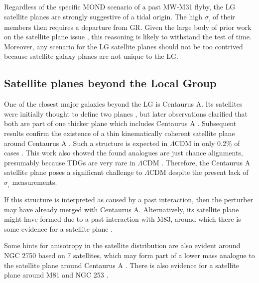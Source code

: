 \documentclass[fleqn,usenatbib,useAMS,onecolumn]{mnras} %
\begin{document}
Regardless of the specific MOND scenario of a past MW-M31 flyby, the LG satellite planes are strongly suggestive of a tidal origin. The high $\sigma_{_i}$ of their members then requires a departure from GR. Given the large body of prior work on the satellite plane issue \citep[reviewed in][]{Pawlowski_2018, Pawlowski_2021}, this reasoning is likely to withstand the test of time. Moreover, any scenario for the LG satellite planes should not be too contrived because satellite galaxy planes are not unique to the LG.



\subsection{Satellite planes beyond the Local Group}
\label{Satellite_planes_beyond_Local_Group}

One of the closest major galaxies beyond the LG is Centaurus A. Its satellites were initially thought to define two planes \citep{Tully_2015_Cen_A}, but later observations clarified that both are part of one thicker plane which includes Centaurus A \citep{Muller_2016}. Subsequent results confirm the existence of a thin kinematically coherent satellite plane around Centaurus A \citep{Muller_2018}. Such a structure is expected in $\Lambda$CDM in only 0.2\% of cases \citep{Muller_2021}. This work also showed the found analogues are just chance alignments, presumably because TDGs are very rare in $\Lambda$CDM \citep[see figure~16 of][]{Haslbauer_2019}. Therefore, the Centaurus A satellite plane poses a significant challenge to $\Lambda$CDM despite the present lack of $\sigma_{_i}$ measurements.

If this structure is interpreted as caused by a past interaction, then the perturber may have already merged with Centaurus A. Alternatively, its satellite plane might have formed due to a past interaction with M83, around which there is some evidence for a satellite plane \citep{Muller_2018_M83}.

Some hints for anisotropy in the satellite distribution are also evident around NGC 2750 based on 7 satellites, which may form part of a lower mass analogue to the satellite plane around Centaurus A \citep{Paudel_2021}. There is also evidence for a satellite plane around M81 \citep{Chiboucas_2013} and NGC 253 \citep{Delgado_2021, Mutlu_2022}.
\end{document}
